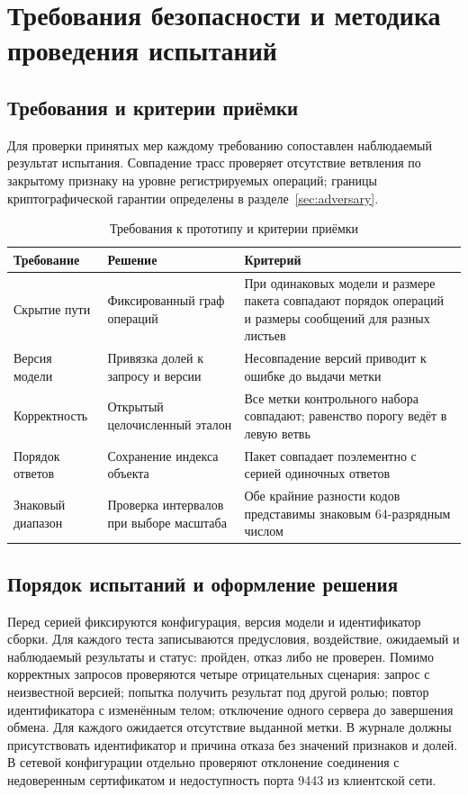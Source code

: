 \section{Требования безопасности и методика проведения испытаний}
\label{sec:methodology}

\subsection{Требования и критерии приёмки}

Для проверки принятых мер каждому требованию сопоставлен наблюдаемый
результат испытания. Совпадение трасс проверяет отсутствие ветвления
по закрытому признаку на уровне регистрируемых операций; границы
криптографической гарантии определены в разделе~\ref{sec:adversary}.
\begin{table}[htbp]
\caption{Требования к прототипу и критерии приёмки}
\centering\small
\begin{tabularx}{\linewidth}{|p{.22\linewidth}|X|X|}
\hline
Требование & Решение & Критерий \\ \hline
Скрытие пути & Фиксированный граф операций & При одинаковых модели и размере пакета совпадают порядок операций и размеры сообщений для разных листьев \\ \hline
Версия модели & Привязка долей к запросу и версии & Несовпадение версий приводит к ошибке до выдачи метки \\ \hline
Корректность & Открытый целочисленный эталон & Все метки контрольного набора совпадают; равенство порогу ведёт в левую ветвь \\ \hline
Порядок ответов & Сохранение индекса объекта & Пакет совпадает поэлементно с серией одиночных ответов \\ \hline
Знаковый диапазон & Проверка интервалов при выборе масштаба & Обе крайние разности кодов представимы знаковым 64-разрядным числом \\ \hline
\end{tabularx}
\end{table}

\subsection{Порядок испытаний и оформление решения}

Перед серией фиксируются конфигурация, версия модели и идентификатор сборки. Для каждого теста записываются предусловия, воздействие, ожидаемый и наблюдаемый результаты и статус: пройден, отказ либо не проверен. Помимо корректных запросов проверяются четыре отрицательных сценария: запрос с неизвестной версией; попытка получить результат под другой ролью; повтор идентификатора с изменённым телом; отключение одного сервера до завершения обмена. Для каждого ожидается отсутствие выданной метки. В журнале должны присутствовать идентификатор и причина отказа без значений признаков и долей. В сетевой конфигурации отдельно проверяют отклонение соединения с недоверенным сертификатом и недоступность порта 9443 из клиентской сети.

